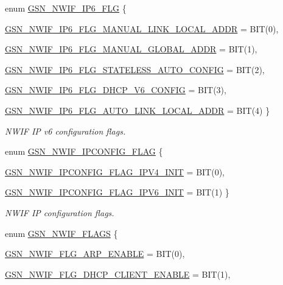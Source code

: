 \begin{DoxyCompactItemize}
enum \hyperlink{a00670_ga283a80240d803667a00eb79d19d53fd6}{GSN\_\-NWIF\_\-IP6\_\-FLG} \{ \par
\hyperlink{a00670_gga283a80240d803667a00eb79d19d53fd6a996c32a475b164cb2153706931f80fa1}{GSN\_\-NWIF\_\-IP6\_\-FLG\_\-MANUAL\_\-LINK\_\-LOCAL\_\-ADDR} =  BIT(0), 
\par
\hyperlink{a00670_gga283a80240d803667a00eb79d19d53fd6a6c066705f0add82f314cdeda98179b58}{GSN\_\-NWIF\_\-IP6\_\-FLG\_\-MANUAL\_\-GLOBAL\_\-ADDR} =  BIT(1), 
\par
\hyperlink{a00670_gga283a80240d803667a00eb79d19d53fd6a5cfda1f3737e1d1d7aa79b8b821ba5fc}{GSN\_\-NWIF\_\-IP6\_\-FLG\_\-STATELESS\_\-AUTO\_\-CONFIG} =  BIT(2), 
\par
\hyperlink{a00670_gga283a80240d803667a00eb79d19d53fd6a8d099635d50df7a353bde782e0d3b0c5}{GSN\_\-NWIF\_\-IP6\_\-FLG\_\-DHCP\_\-V6\_\-CONFIG} =  BIT(3), 
\par
\hyperlink{a00670_gga283a80240d803667a00eb79d19d53fd6a22c3526ea733e9e3e571b9e47455ad14}{GSN\_\-NWIF\_\-IP6\_\-FLG\_\-AUTO\_\-LINK\_\-LOCAL\_\-ADDR} = BIT(4)
 \}
\begin{DoxyCompactList}\small\item\em NWIF IP v6 configuration flags. \end{DoxyCompactList}\item 
enum \hyperlink{a00670_gaa290d30cd14afde370ebe3cc0bc80713}{GSN\_\-NWIF\_\-IPCONFIG\_\-FLAG} \{ \par
\hyperlink{a00670_ggaa290d30cd14afde370ebe3cc0bc80713ad2faaf1e7aa840a7a5e6f0b87f771010}{GSN\_\-NWIF\_\-IPCONFIG\_\-FLAG\_\-IPV4\_\-INIT} =  BIT(0), 
\par
\hyperlink{a00670_ggaa290d30cd14afde370ebe3cc0bc80713aee3c914de355b83ae9273c0cf45f1fe3}{GSN\_\-NWIF\_\-IPCONFIG\_\-FLAG\_\-IPV6\_\-INIT} =  BIT(1)
 \}
\begin{DoxyCompactList}\small\item\em NWIF IP configuration flags. \end{DoxyCompactList}\item 
enum \hyperlink{a00670_gaa0ec94e77c73c9648888a870bd0f041a}{GSN\_\-NWIF\_\-FLAGS} \{ \par
\hyperlink{a00670_ggaa0ec94e77c73c9648888a870bd0f041aa9dc36bd7a233781adb8c75441c6179b8}{GSN\_\-NWIF\_\-FLG\_\-ARP\_\-ENABLE} =  BIT(0), 
\par
\hyperlink{a00670_ggaa0ec94e77c73c9648888a870bd0f041aa0666e123f6937fbd3deb7024c9f25236}{GSN\_\-NWIF\_\-FLG\_\-DHCP\_\-CLIENT\_\-ENABLE} =  BIT(1), 
\par

\end{DoxyCompactItemize}
